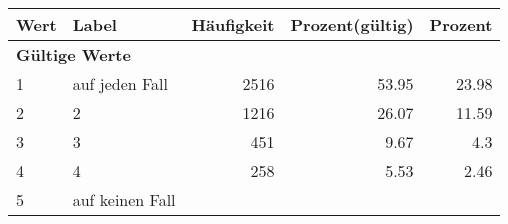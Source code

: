      \begin{longtable}{lXrrr}
     \toprule
     \textbf{Wert} & \textbf{Label} & \textbf{Häufigkeit} & \textbf{Prozent(gültig)} & \textbf{Prozent} \\
     \endhead
     \midrule
     \multicolumn{5}{l}{\textbf{Gültige Werte}}\\

     1 &
     \multicolumn{1}{X}{ auf jeden Fall   } &


       \num{2516} &
       \num[round-mode=places,round-precision=2]{53,95} &
         \num[round-mode=places,round-precision=2]{23,98} \\

     2 &
     \multicolumn{1}{X}{ 2   } &


       \num{1216} &
       \num[round-mode=places,round-precision=2]{26,07} &
         \num[round-mode=places,round-precision=2]{11,59} \\

     3 &
     \multicolumn{1}{X}{ 3   } &


       \num{451} &
       \num[round-mode=places,round-precision=2]{9,67} &
         \num[round-mode=places,round-precision=2]{4,3} \\

     4 &
     \multicolumn{1}{X}{ 4   } &


       \num{258} &
       \num[round-mode=places,round-precision=2]{5,53} &
         \num[round-mode=places,round-precision=2]{2,46} \\

     5 &
     \multicolumn{1}{X}{ auf keinen Fall   } &



\end{longtable}
